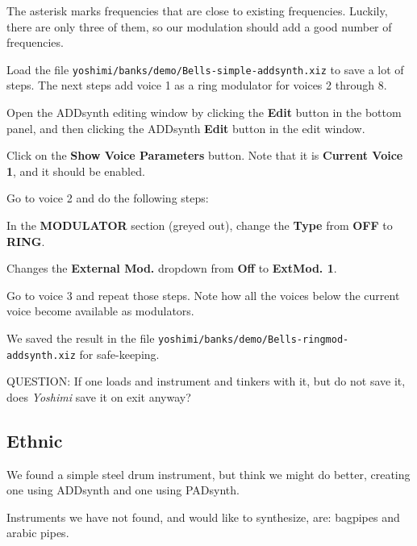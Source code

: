    The asterisk marks frequencies that are close to existing
   frequencies.   Luckily, there are only three of them, so our
   modulation should add a good number of frequencies.

   \begin{enumber}
      \item Load the file \texttt{yoshimi/banks/demo/Bells-simple-addsynth.xiz}
         to save a lot of steps.  The next steps add voice 1 as a ring
         modulator for voices 2 through 8.
      \item Open the ADDsynth editing window by clicking the \textbf{Edit}
         button in the bottom panel, and then clicking the ADDsynth
         \textbf{Edit} button in the edit window.
      \item Click on the \textbf{Show Voice Parameters} button.
         Note that it is \textbf{Current Voice 1}, and it should be enabled.
      \item Go to voice 2 and do the following steps:
         \begin{enumber}
            \item In the \textbf{MODULATOR} section (greyed out), change the
               \textbf{Type} from \textbf{OFF} to \textbf{RING}.
            \item Changes the \textbf{External Mod.} dropdown from
               \textbf{Off} to \textbf{ExtMod. 1}.
         \end{enumber}
      \item Go to voice 3 and repeat those steps.  Note how all the voices
         below the current voice become available as modulators.
   \end{enumber}

   We saved the result in the file
   \texttt{yoshimi/banks/demo/Bells-ringmod-addsynth.xiz} for safe-keeping.

   QUESTION:  If one loads and instrument and tinkers with it, but do not
   save it, does \textsl{Yoshimi} save it on exit anyway?

\subsection{Ethnic}
\label{subsec:cookbook_instruments_ethnic}

   We found a simple steel drum instrument, but think we might do better,
   creating one using ADDsynth and one using PADsynth.

   Instruments we have not found, and would like to synthesize, are:
   bagpipes and arabic pipes.


